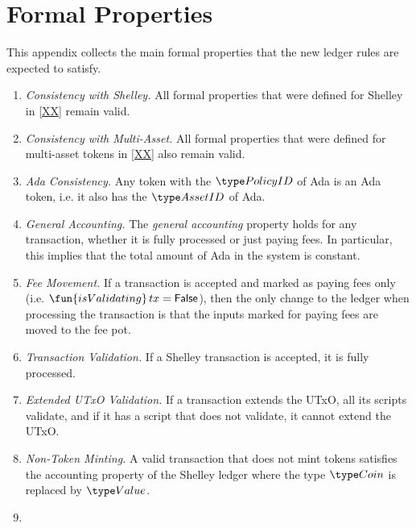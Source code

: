 \section{Formal Properties}
\label{sec:properties}

This appendix collects the main formal properties that the new ledger rules are expected to satisfy.

\begin{enumerate}[label=P{\arabic*}:\ ]
\item
  \emph{Consistency with Shelley.}
  All formal properties that were defined for Shelley in \ref{XX} remain valid.
\item
  \emph{Consistency with Multi-Asset.}
  All formal properties that were defined for multi-asset tokens in \ref{XX} also remain valid.
\item
  \emph{Ada Consistency.}
  Any token with the $\PolicyID$ of Ada is an Ada token, i.e. it
  also has the $\AssetID$ of Ada.
\item
  \emph{General Accounting.}
  The \emph{general accounting} property holds for any transaction,
  whether it is fully processed or just paying fees. In particular,
  this implies that the total amount of Ada in the system is constant.
\item
  \emph{Fee Movement.}
  If a transaction is accepted and marked as paying fees only
  (i.e. $\fun{isValidating}\, tx = \False$), then the only change to the ledger
  when processing the transaction is that the inputs marked for paying
  fees are moved to the fee pot.
\item
  \emph{Transaction Validation.}
  If a Shelley transaction is accepted, it is fully processed.
\item
  \emph{Extended UTxO Validation.}
  If a transaction extends the UTxO, all its scripts validate, and
  if it has a script that does not validate, it cannot extend the
  UTxO.
\item
  \emph{Non-Token Minting.}
  A valid transaction that does not mint tokens satisfies the
  accounting property of the Shelley ledger where the type $\Coin$ is
  replaced by $\Value$.
\item

\end{enumerate}
